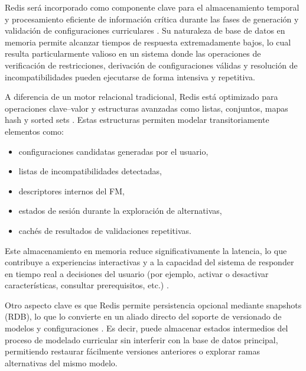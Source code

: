 {{        Redis será incorporado como componente clave para el almacenamiento temporal 
        y procesamiento eficiente de información crítica durante las fases de 
        generación y validación de configuraciones curriculares \citep{carlson2013redis}. Su naturaleza de 
        base de datos en memoria permite alcanzar tiempos de respuesta extremadamente 
        bajos, lo cual resulta particularmente valioso en un sistema donde las 
        operaciones de verificación de restricciones, derivación de configuraciones 
        válidas y resolución de incompatibilidades pueden ejecutarse de forma intensiva 
        y repetitiva.

        A diferencia de un motor relacional tradicional, Redis está optimizado 
        para operaciones clave–valor y estructuras avanzadas como listas, conjuntos, 
        mapas hash y sorted sets \citep{carlson2013redis}. Estas estructuras permiten modelar transitoriamente 
        elementos como:
        \begin{itemize}
            \item configuraciones candidatas generadas por el usuario,
            
            \item listas de incompatibilidades detectadas,
            
            \item descriptores internos del \ac{FM},
            
            \item estados de sesión durante la exploración de alternativas,
            
            \item cachés de resultados de validaciones repetitivas.
        \end{itemize}

        Este almacenamiento en memoria reduce significativamente la latencia, lo que 
        contribuye a experiencias interactivas y a la capacidad del sistema de 
        responder en tiempo real a decisiones del usuario (por ejemplo, activar 
        o desactivar características, consultar prerequisitos, etc.) \citep{carlson2013redis}.

        Otro aspecto clave es que Redis permite persistencia opcional mediante 
        snapshots (\ac{RDB}), lo que lo convierte en un aliado directo del soporte de 
        versionado de modelos y configuraciones \citep{carlson2013redis}. Es decir, puede almacenar estados 
        intermedios del proceso de modelado curricular sin interferir con la base de 
        datos principal, permitiendo restaurar fácilmente versiones anteriores o 
        explorar ramas alternativas del mismo modelo.

}}
